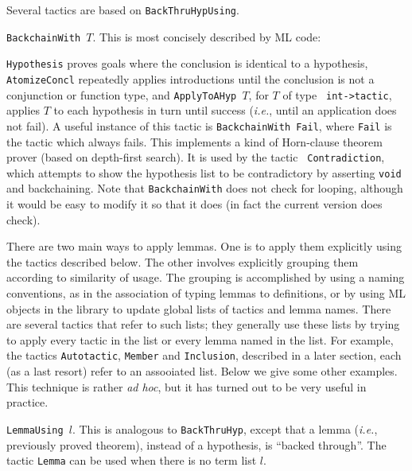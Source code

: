 Several tactics are based on {\tt BackThruHypUsing}.

{\tt BackchainWith $T$}.  This is most concisely described by ML code:  
\begin{Numath}
%
\end{Numath}%
{\tt Hypothesis} proves goals where the conclusion is identical to a hypothesis,
{\tt Atomize\-Concl} repeatedly applies introductions until the conclusion is not
a conjunction or function type, and {\tt ApplyToAHyp $T$}, for $T$ of type {\tt
int->tactic}, applies $T$ to each hypothesis in turn until success ({\em i.e.},
until an application does not fail).  A useful
instance of this tactic is {\tt BackchainWith Fail}, where {\tt Fail} is the
tactic which always fails.  This implements a kind of Horn-clause theorem
prover (based on depth-first search).  It is used by the tactic {\tt
Contradiction}, which attempts to show the hypothesis list to be contradictory
by asserting {\tt void} and backchaining.  Note that {\tt BackchainWith} does
not check for looping, although it would be easy to modify it so that it does
(in fact the current version does check).

There are two main ways to apply lemmas.  One is to apply them explicitly
using the tactics described below.  The other involves explicitly grouping
them according to similarity of usage.  The grouping is accomplished by using
a naming conventions, as in the association of typing lemmas to definitions,
or by using ML objects in the library to update global lists of tactics
and lemma names.  There are several tactics that refer to such lists; they
generally use these lists by trying to apply every tactic in the list or
every lemma named in the list.  For example, the tactics {\tt Autotactic},
{\tt Member}
and {\tt Inclusion}, described in a later section, each (as a last resort)
refer to an assooiated list.  Below we give some other examples.  This
technique is rather {\em ad hoc}, but it has turned out to be very useful in
practice.  

{\tt LemmaUsing  $l$}.  This is analogous to {\tt BackThruHyp},
except that a lemma ({\em i.e.}, previously proved theorem), instead of a
hypothesis, is
``backed through''.  The tactic {\tt Lemma} can be used when there is no term list
$l$.

